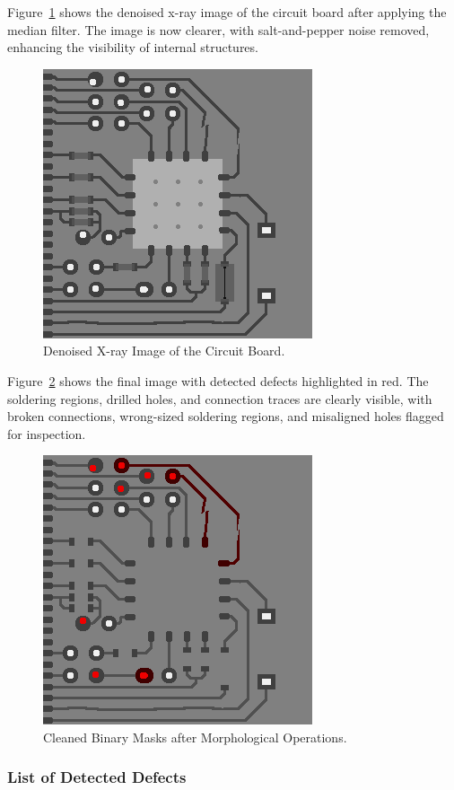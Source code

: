 \documentclass[a4paper,12pt]{article}
\begin{document}
Figure~\ref{fig:image_denoised} shows the denoised x-ray image of the circuit board after applying the median filter. The image is now clearer, with salt-and-pepper noise removed, enhancing the visibility of internal structures.

\begin{figure}[!htbp]
    \centering
    \includegraphics[width=0.5\linewidth]{data/output/circuit_board_qa/image_denoised.png}
    \caption{Denoised X-ray Image of the Circuit Board.}
    \label{fig:image_denoised}
\end{figure}

Figure~\ref{fig:final_image} shows the final image with detected defects highlighted in red. The soldering regions, drilled holes, and connection traces are clearly visible, with broken connections, wrong-sized soldering regions, and misaligned holes flagged for inspection.

\begin{figure}[!htbp]
    \centering
    \includegraphics[width=0.5\linewidth]{data/output/circuit_board_qa/final_image.png}
    \caption{Cleaned Binary Masks after Morphological Operations.}
    \label{fig:final_image}
\end{figure}

\subsubsection{List of Detected Defects}
\end{document}
